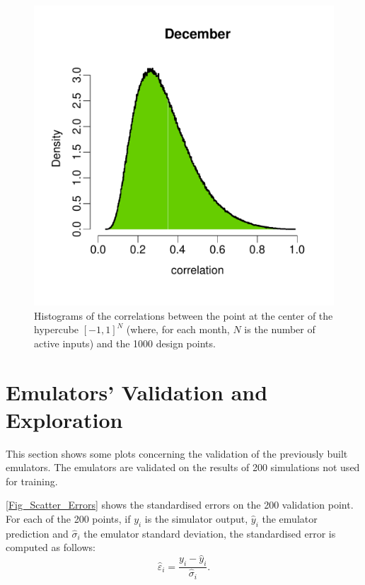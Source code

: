 \documentclass[a4paper, 12pt]{article}
\newcommand{\eps}{\varepsilon}
\begin{document}
\begin{figure}
 \includegraphics[width=\scale]{Validation_Plots/Correlation/Correlation_12_Dec}
 \caption{Histograms of the correlations between the point at the center of the hypercube $[-1,1]^N$ (where, for each month, $N$ is the number of active inputs) and the 1000 design points.}
 \label{Fig_Correlation}
\end{figure}



\section{Emulators' Validation and Exploration}
This section shows some plots concerning the validation of the previously built emulators. The emulators are validated on the results of 200 simulations not used for training.

\autoref{Fig_Scatter_Errors} shows the standardised errors on the 200 validation point. For each of the 200 points, if $y_i$ is the simulator output, $\hat{y}_i$ the emulator prediction and $\hat{\sigma}_i$ the emulator standard deviation, the standardised error is computed as follows:
\begin{equation}\label{Eqn_St_Er}
\hat{\eps}_i = \frac{y_i - \hat{y}_i}{\hat \sigma_i}.
\end{equation}
\end{document}
